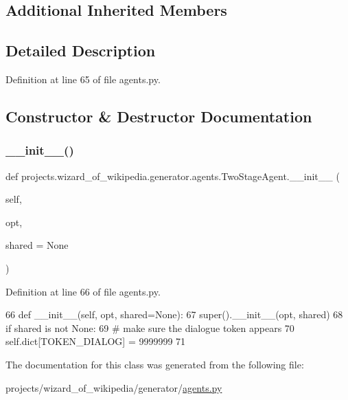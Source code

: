 \subsection*{Additional Inherited Members}


\subsection{Detailed Description}


Definition at line 65 of file agents.\+py.



\subsection{Constructor \& Destructor Documentation}
\mbox{\label{classprojects_1_1wizard__of__wikipedia_1_1generator_1_1agents_1_1TwoStageAgent_a5aae49d192aac40f8fde1b1c42409261}} 
\subsubsection{\texorpdfstring{\+\_\+\+\_\+init\+\_\+\+\_\+()}{\_\_init\_\_()}}
{\footnotesize\ttfamily def projects.\+wizard\+\_\+of\+\_\+wikipedia.\+generator.\+agents.\+Two\+Stage\+Agent.\+\_\+\+\_\+init\+\_\+\+\_\+ (\begin{DoxyParamCaption}\item[{}]{self,  }\item[{}]{opt,  }\item[{}]{shared = {\ttfamily None} }\end{DoxyParamCaption})}



Definition at line 66 of file agents.\+py.


\begin{DoxyCode}
66     \textcolor{keyword}{def }\_\_init\_\_(self, opt, shared=None):
67         super().\_\_init\_\_(opt, shared)
68         \textcolor{keywordflow}{if} shared \textcolor{keywordflow}{is} \textcolor{keywordflow}{not} \textcolor{keywordtype}{None}:
69             \textcolor{comment}{# make sure the dialogue token appears}
70             self.dict[TOKEN\_DIALOG] = 9999999
71 
\end{DoxyCode}


The documentation for this class was generated from the following file\+:\begin{DoxyCompactItemize}
\item 
projects/wizard\+\_\+of\+\_\+wikipedia/generator/\hyperlink{projects_2wizard__of__wikipedia_2generator_2agents_8py}{agents.\+py}\end{DoxyCompactItemize}

